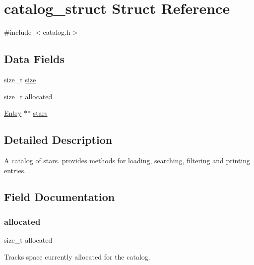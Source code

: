 \hypertarget{structcatalog__struct}{}\section{catalog\+\_\+struct Struct Reference}
\label{structcatalog__struct}


{\ttfamily \#include $<$catalog.\+h$>$}

\subsection*{Data Fields}
\begin{DoxyCompactItemize}
\item 
size\+\_\+t \mbox{\hyperlink{structcatalog__struct_a854352f53b148adc24983a58a1866d66}{size}}
\item 
size\+\_\+t \mbox{\hyperlink{structcatalog__struct_ae1bb12c74f8787980ecef2b1f772239b}{allocated}}
\item 
\mbox{\hyperlink{catalog_8h_aa67e826d3ce187b06707d407683af813}{Entry}} $\ast$$\ast$ \mbox{\hyperlink{structcatalog__struct_ae9a5d6bc40976d00eef67a78d939d3d3}{stars}}
\end{DoxyCompactItemize}


\subsection{Detailed Description}
A catalog of stars. provides methods for loading, searching, filtering and printing entries. 

\subsection{Field Documentation}
\mbox{\label{structcatalog__struct_ae1bb12c74f8787980ecef2b1f772239b}} 
\subsubsection{\texorpdfstring{allocated}{allocated}}
{\footnotesize\ttfamily size\+\_\+t allocated}

Tracks space currently allocated for the catalog. \mbox{\label{structcatalog__struct_a854352f53b148adc24983a58a1866d66}} 
